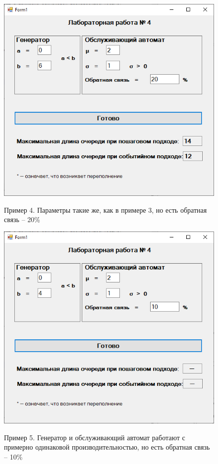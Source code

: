\begin{figure}[h]
	\begin{center}
		{\includegraphics[scale = 0.7]{img/ex4.png}}
		\caption{Пример 4. Параметры такие же, как в примере 3, но есть обратная связь -- 20\%}
		\label{fig4:image}
	\end{center}
\end{figure}

\begin{figure}[h!]
	\begin{center}
		{\includegraphics[scale = 0.7]{img/ex5.png}}
		\caption{Пример 5. Генератор и обслуживающий автомат работают с примерно одинаковой производительностью, но есть обратная связь -- 10\%}
		\label{fig5:image}
	\end{center}
\end{figure}

\newpage

